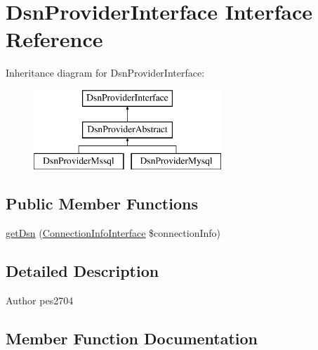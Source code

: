 \hypertarget{interface_pes_1_1_database_1_1_handler_1_1_dsn_provider_1_1_dsn_provider_interface}{}\section{Dsn\+Provider\+Interface Interface Reference}
\label{interface_pes_1_1_database_1_1_handler_1_1_dsn_provider_1_1_dsn_provider_interface}
Inheritance diagram for Dsn\+Provider\+Interface\+:\begin{figure}[H]
\begin{center}
\leavevmode
\includegraphics[height=3.000000cm]{interface_pes_1_1_database_1_1_handler_1_1_dsn_provider_1_1_dsn_provider_interface}
\end{center}
\end{figure}
\subsection*{Public Member Functions}
\begin{DoxyCompactItemize}
\item 
\mbox{\hyperlink{interface_pes_1_1_database_1_1_handler_1_1_dsn_provider_1_1_dsn_provider_interface_a7252e2f23ea50a5061fef81d06d6765a}{get\+Dsn}} (\mbox{\hyperlink{interface_pes_1_1_database_1_1_handler_1_1_connection_info_interface}{Connection\+Info\+Interface}} \$connection\+Info)
\end{DoxyCompactItemize}


\subsection{Detailed Description}
\begin{DoxyAuthor}{Author}
pes2704 
\end{DoxyAuthor}


\subsection{Member Function Documentation}
\mbox{\label{interface_pes_1_1_database_1_1_handler_1_1_dsn_provider_1_1_dsn_provider_interface_a7252e2f23ea50a5061fef81d06d6765a}} 
